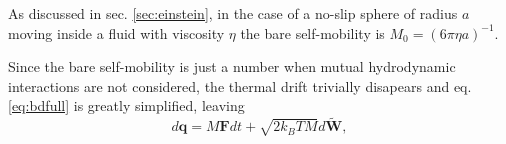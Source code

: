 \documentclass[ twoside,openright,titlepage,numbers=noenddot,%
headinclude,footinclude,cleardoublepage=empty,abstract=on,
BCOR=5mm,paper=a4,fontsize=11pt, dvipsnames
]{scrreprt}
\renewcommand{\vec}[1]{\bm{#1}}
\newcommand{\dt}{\delta t}
\newcommand{\kT}{k_B T}
\newcommand{\noise}{\widetilde{W}}
\newcommand{\ppos}{q}
\begin{document}
As discussed in sec. \ref{sec:einstein}, in the case of a no-slip sphere of radius $a$ moving inside a fluid with viscosity $\eta$ the bare self-mobility is $M_0 = (6\pi\eta a)^{-1}$.

Since the bare self-mobility is just a number when mutual hydrodynamic interactions are not considered, the thermal drift trivially disapears and eq. \eqref{eq:bdfull} is greatly simplified, leaving
\begin{equation}
  \label{eq:bd}
  d\vec{\ppos} = M\vec{F}dt + \sqrt{2\kT M}d\vec{\noise},
\end{equation}


\end{document}
